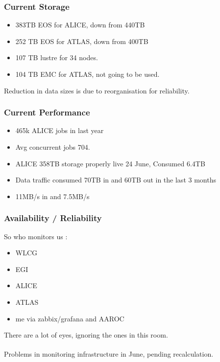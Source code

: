 \documentclass{beamer}
\begin{document}
\begin{frame}
  \frametitle{Current Storage}
  \begin{itemize}
    \item 383TB EOS for ALICE, down from 440TB
    \item 252 TB EOS for ATLAS, down from 400TB
    \item 107 TB lustre for 34 nodes.
    \item 104 TB EMC for ATLAS, not going to be used.
  \end{itemize}
Reduction in data sizes is due to reorganisation for reliability.
\end{frame}


\begin{frame}
  \frametitle{Current Performance}
\begin{itemize}
  \item 465k ALICE jobs in last year
  \item Avg concurrent jobs 704.
  \item ALICE 358TB storage properly live 24 June, Consumed 6.4TB 
  \item Data traffic consumed 70TB in and 60TB out in the last 3 months
  \item 11MB/s in and 7.5MB/s
\end{itemize}

\end{frame}

\begin{frame}
  \frametitle{Availability / Reliability}
  So who monitors us :
  \begin{itemize}
    \item WLCG
    \item EGI
    \item ALICE
    \item ATLAS
    \item me via zabbix/grafana and AAROC 
  \end{itemize}
There are a lot of eyes, ignoring the ones in this room.\\
\vspace{0.5cm}
\\
\vspace{0.5cm}
Problems in monitoring infrastructure in June, pending recalculation.
\end{frame}
\end{document}
